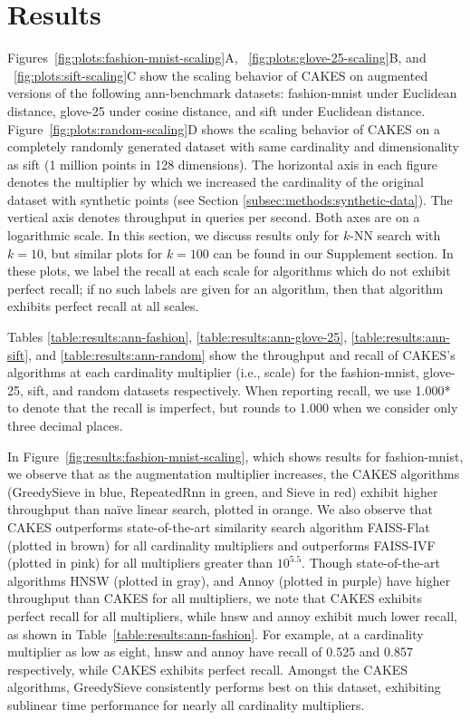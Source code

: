 \section{Results}
\label{sec:results}


Figures~\ref{fig:plots:fashion-mnist-scaling}A, ~\ref{fig:plots:glove-25-scaling}B, and ~\ref{fig:plots:sift-scaling}C show the scaling behavior of CAKES on augmented versions of the following ann-benchmark datasets: fashion-mnist under Euclidean distance, glove-25 under cosine distance, and sift under Euclidean distance. 
Figure~\ref{fig:plots:random-scaling}D shows the scaling behavior of CAKES on a completely randomly generated dataset with same cardinality and dimensionality as sift (1 million points in 128 dimensions).
The horizontal axis in each figure denotes the multiplier by which we increased the cardinality of the original dataset with synthetic points (see Section \ref{subsec:methods:synthetic-data}). 
The vertical axis denotes throughput in queries per second. Both axes are on a logarithmic scale. In this section, we discuss results only for $k$-NN search with $k = 10$, but similar plots for $k=100$ can be found in our Supplement section. In these plots, we label the recall at each scale for algorithms which do not exhibit perfect recall; if no such labels are given for an algorithm, then that algorithm exhibits perfect recall at all scales.

Tables \ref{table:results:ann-fashion}, \ref{table:results:ann-glove-25}, \ref{table:results:ann-sift}, and \ref{table:results:ann-random} show the throughput and recall of CAKES's algorithms at each cardinality multiplier (i.e., scale) for the fashion-mnist, glove-25, sift, and random datasets respectively. When reporting recall, we use 1.000* to denote that the recall is imperfect, but rounds to 1.000 when we consider
only three decimal places.

In Figure~\ref{fig:results:fashion-mnist-scaling}, which shows results for fashion-mnist, we observe that as the augmentation multiplier increases, the CAKES algorithms (GreedySieve in blue, RepeatedRnn in green, and Sieve in red) exhibit higher throughput than na\"{i}ve linear search, plotted in orange. We also observe that CAKES outperforms state-of-the-art similarity search algorithm FAISS-Flat (plotted in brown) for all cardinality multipliers and outperforms FAISS-IVF (plotted in pink) for all multipliers greater than $10^{5.5}$. Though state-of-the-art algorithms HNSW (plotted in gray), and Annoy (plotted in purple) have higher throughput than CAKES for all multipliers, we note that CAKES exhibits perfect recall for all multipliers, while hnsw and annoy exhibit much lower recall, as shown in Table~\ref{table:results:ann-fashion}. For example, at a cardinality multiplier as low as eight, hnsw and annoy have recall of 0.525 and 0.857 respectively, while CAKES exhibits perfect recall.
Amongst the CAKES algorithms, GreedySieve consistently performs best on this dataset, exhibiting sublinear time performance for nearly all cardinality multipliers. 


